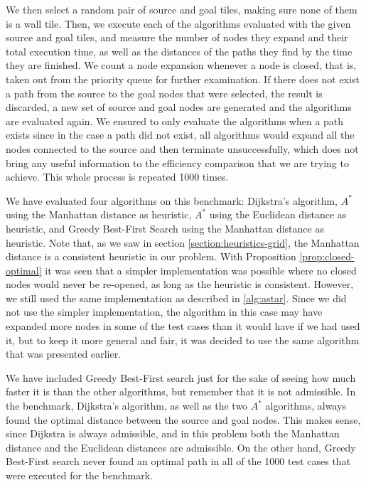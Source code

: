 \documentclass[a4paper,10pt]{report}
\begin{document}
We then select a random pair of source and goal tiles, making sure none of them is a wall tile. Then, we execute each of the algorithms evaluated with the given source and goal tiles, and measure the number of nodes they expand and their total execution time, as well as the distances of the paths they find by the time they are finished. We count a node expansion whenever a node is closed, that is, taken out from the priority queue for further examination. If there does not exist a path from the source to the goal nodes that were selected, the result is discarded, a new set of source and goal nodes are generated and the algorithms are evaluated again. We ensured to only evaluate the algorithms when a path exists since in the case a path did not exist, all algorithms would expand all the nodes connected to the source and then terminate unsuccessfully, which does not bring any useful information to the efficiency comparison that we are trying to achieve. This whole process is repeated 1000 times.

We have evaluated four algorithms on this benchmark: Dijkstra's algorithm, $A^*$ using the Manhattan distance as heuristic, $A^*$ using the Euclidean distance as heuristic, and Greedy Best-First Search using the Manhattan distance as heuristic. Note that, as we saw in section \ref{section:heuristics-grid}, the Manhattan distance is a consistent heuristic in our problem. With Proposition \ref{prop:closed-optimal} it was seen that a simpler implementation was possible where no closed nodes would never be re-opened, as long as the heuristic is consistent. However, we still used the same implementation as described in \ref{alg:astar}. Since we did not use the simpler implementation, the algorithm in this case may have expanded more nodes in some of the test cases than it would have if we had used it, but to keep it more general and fair, it was decided to use the same algorithm that was presented earlier.

We have included Greedy Best-First search just for the sake of seeing how much faster it is than the other algorithms, but remember that it is not admissible. In the benchmark, Dijkstra's algorithm, as well as the two $A^*$ algorithms, always found the optimal distance between the source and goal nodes. This makes sense, since Dijkstra is always admissible, and in this problem both the Manhattan distance and the Euclidean distances are admissible. On the other hand, Greedy Best-First search never found an optimal path in all of the 1000 test cases that were executed for the benchmark.
\end{document}
